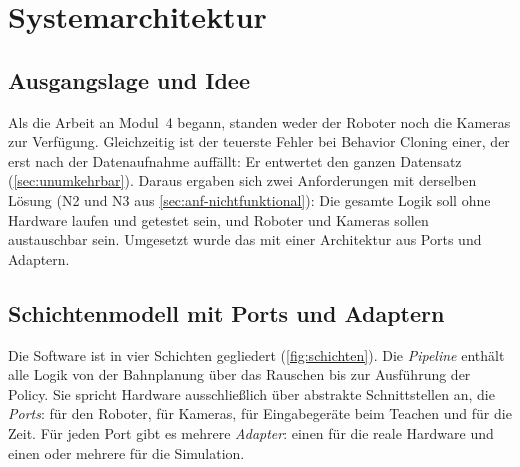 \chapter{Systemarchitektur}
\label{ch:architektur}

\section{Ausgangslage und Idee}
\label{sec:arch-idee}

Als die Arbeit an Modul~4 begann, standen weder der Roboter noch die Kameras zur Verfügung.
Gleichzeitig ist der teuerste Fehler bei Behavior Cloning einer, der erst nach der
Datenaufnahme auffällt: Er entwertet den ganzen Datensatz (\cref{sec:unumkehrbar}). Daraus
ergaben sich zwei Anforderungen mit derselben Lösung (N2 und N3 aus
\cref{sec:anf-nichtfunktional}): Die gesamte Logik soll ohne Hardware laufen und getestet
sein, und Roboter und Kameras sollen austauschbar sein. Umgesetzt wurde das mit einer
Architektur aus Ports und Adaptern.

\section{Schichtenmodell mit Ports und Adaptern}
\label{sec:ports}

Die Software ist in vier Schichten gegliedert (\cref{fig:schichten}). Die
\emph{Pipeline} enthält alle Logik von der Bahnplanung über das Rauschen bis zur Ausführung
der Policy. Sie spricht Hardware ausschließlich über abstrakte Schnittstellen an, die
\emph{Ports}:  für den Roboter,  für Kameras,
 für Eingabegeräte beim Teachen und  für die Zeit. Für jeden
Port gibt es mehrere \emph{Adapter}: einen für die reale Hardware und einen oder mehrere für
die Simulation.

